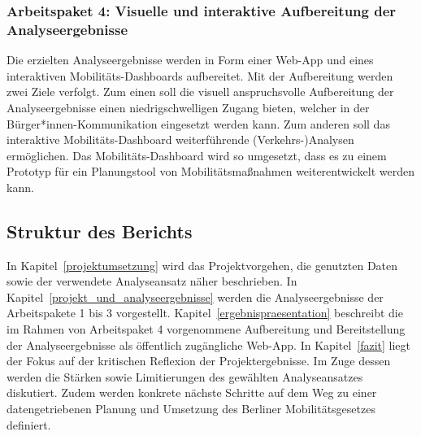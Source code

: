 \subsubsection{Arbeitspaket 4: Visuelle und interaktive Aufbereitung der Analyseergebnisse}

Die erzielten Analyseergebnisse werden in Form einer Web-App und eines interaktiven Mobilitäts-Dashboards aufbereitet. Mit der Aufbereitung werden zwei Ziele verfolgt. Zum einen soll die visuell anspruchsvolle Aufbereitung der Analyseergebnisse einen niedrigschwelligen Zugang bieten, welcher in der Bürger*innen-Kommunikation eingesetzt werden kann. Zum anderen soll das interaktive Mobilitäts-Dashboard weiterführende (Verkehrs-)Analysen ermöglichen. Das Mobilitäts-Dashboard wird so umgesetzt, dass es zu einem Prototyp für ein Planungstool von Mobilitätsmaßnahmen weiterentwickelt werden kann.

\subsection{Struktur des Berichts}
In Kapitel~\ref{projektumsetzung} wird das Projektvorgehen, die genutzten Daten sowie der verwendete Analyseansatz näher beschrieben. In Kapitel~\ref{projekt_und_analyseergebnisse} werden die Analyseergebnisse der Arbeitspakete 1 bis 3 vorgestellt. Kapitel~\ref{ergebnispraesentation} beschreibt die im Rahmen von Arbeitspaket 4 vorgenommene Aufbereitung und Bereitstellung der Analyseergebnisse als öffentlich zugängliche Web-App. In Kapitel~\ref{fazit} liegt der Fokus auf der kritischen Reflexion der Projektergebnisse. Im Zuge dessen werden die Stärken sowie Limitierungen des gewählten Analyseansatzes diskutiert. Zudem werden konkrete nächste Schritte auf dem Weg zu einer datengetriebenen Planung und Umsetzung des Berliner Mobilitätsgesetzes definiert.
